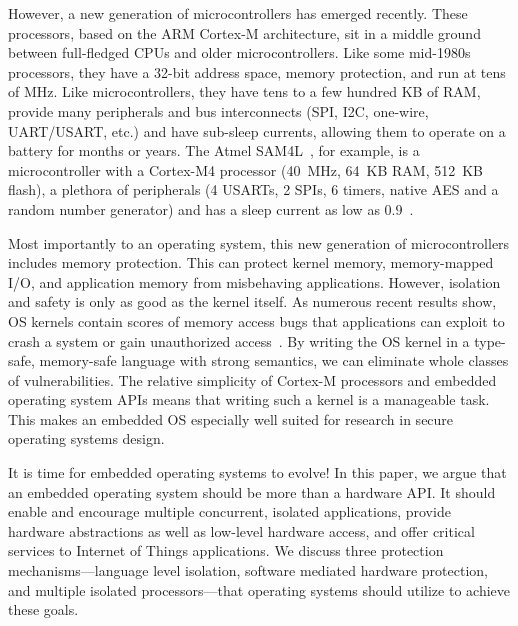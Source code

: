 However, a new generation of microcontrollers has emerged recently.
These processors, based on the ARM Cortex-M architecture, sit in a middle ground
between full-fledged CPUs and older microcontrollers. Like some mid-1980s processors,
they have a 32-bit address space, memory protection, and run at tens of MHz.
Like microcontrollers, they have tens to a few hundred KB of RAM, provide many
peripherals and bus interconnects (SPI, I2C, one-wire, UART/USART, etc.) and
have sub-\uA sleep currents, allowing them to operate on a battery for
months or years. The Atmel SAM4L~\cite{sam4l}, for example, is a
microcontroller with a Cortex-M4 processor (40~MHz, 64~KB RAM, 512~KB flash), a
plethora of peripherals (4 USARTs, 2 SPIs, 6 timers, native AES and a random number
generator) and has a sleep current as low as $0.9$~\uA.

Most importantly to an operating system, this new generation of microcontrollers includes
memory protection.
This can protect kernel memory, memory-mapped I/O, and
application memory from misbehaving applications. However,
isolation and safety is only as good as the kernel itself. As numerous recent
results show, OS kernels contain scores of memory access bugs that applications
can exploit to crash a system or gain unauthorized
access~\cite{kint:osdi2012,linuxvulns:apsys11}. By writing the OS kernel in a
type-safe, memory-safe language with strong semantics, we can eliminate whole
classes of vulnerabilities. The relative simplicity of Cortex-M processors and
embedded operating system APIs means that writing such a kernel is a
manageable task.  This makes an embedded OS especially well suited for
research in secure operating systems design.

It is time for embedded operating systems to evolve! In this paper, we argue
that an embedded operating system should be more than a hardware API.
It should enable and encourage
multiple concurrent, isolated applications, provide  hardware abstractions
as well as low-level hardware access, and offer critical services to Internet
of Things applications. We discuss three protection
mechanisms---language level isolation, software mediated hardware protection, and
multiple isolated processors---that operating systems should utilize to achieve
these goals.


%
